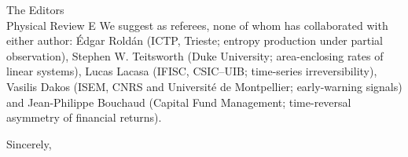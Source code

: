 \documentclass[11pt]{letter}
\begin{document}
\begin{letter}{The Editors\\Physical Review E}
We suggest as referees, none of whom has collaborated with either author: \'Edgar Rold\'an (ICTP, Trieste; entropy production under partial observation), Stephen W. Teitsworth (Duke University; area-enclosing rates of linear systems), Lucas Lacasa (IFISC, CSIC--UIB; time-series irreversibility), Vasilis Dakos (ISEM, CNRS and Universit\'e de Montpellier; early-warning signals) and Jean-Philippe Bouchaud (Capital Fund Management; time-reversal asymmetry of financial returns).
\closing{Sincerely,}
\end{letter}
\end{document}
